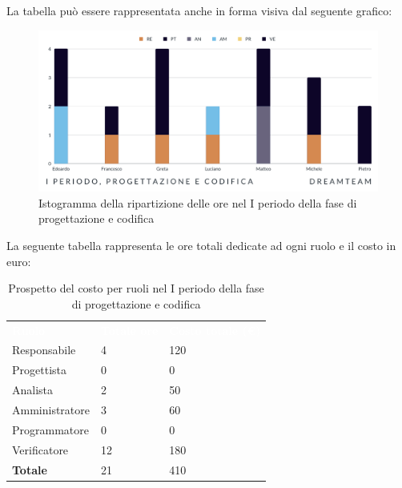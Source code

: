 La tabella può essere rappresentata anche in forma visiva dal seguente grafico:
\begin{figure}[H]
\centering
\includegraphics[scale=0.65]{Sezioni/SezioniPreventivo/grafici/Progettazione_codifica_I_periodo.png}
\caption{Istogramma della ripartizione delle ore nel I periodo della fase di progettazione e codifica}
\end{figure}

La seguente tabella rappresenta le ore totali dedicate ad ogni ruolo e il costo in euro:

\begin{table}[H]
\begin{center}
\renewcommand{\arraystretch}{1.5}
\begin{tabular}{ m{}<{\centering}  m{}<{\centering} m{}<{\centering}}
	\rowcolor{darkblue}
	\textcolor{white}{\textbf{Ruolo}}&\textcolor{white}{\textbf{Totale ore}}&\textcolor{white}{\textbf{Costo totale (\euro)}}\\ 

	Responsabile  & 4 & 120 \\	
	
	Progettista & 0 & 0 \\
	
	Analista & 2 & 50 \\

	Amministratore & 3 & 60 \\
	
	Programmatore & 0 & 0 \\
	
	Verificatore & 12 & 180 \\
	
	\textbf{Totale} & 21 & 410 \\
	
\end{tabular}
\caption{Prospetto del costo per ruoli nel I periodo della fase di progettazione e codifica}
\end{center}
\end{table}

